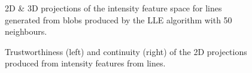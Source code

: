 \begin{figure}[H]
	\centering
	\caption{2D \& 3D projections of the intensity feature space for lines generated from blobs produced by the LLE algorithm with 50 neighbours.}\label{fig:intensity_LLE_mapping_lines}
\end{figure}
\clearpage


\clearpage
\begin{figure}[H]
	\centering
	\caption{Trustworthiness (left) and continuity (right) of the 2D projections produced from intensity features from lines.}\label{fig:TC_2d_intensity}
\end{figure}

